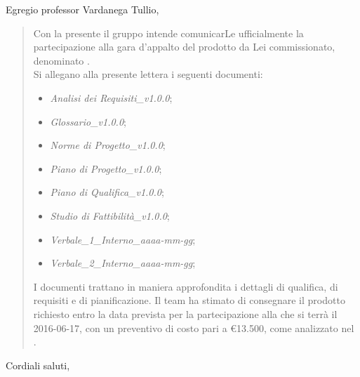 \documentclass{letter}
\begin{document}
\begin{letter}
		\opening{Egregio professor Vardanega Tullio,}
			\begin{quotation}			
				Con la presente il gruppo \gruppo intende comunicarLe ufficialmente la partecipazione alla gara d'appalto del prodotto da Lei commissionato, denominato \textbf{\progetto}.
				\\
				Si allegano alla presente lettera i seguenti documenti:
				\begin{itemize}
					\item \textit{Analisi dei Requisiti\_v1.0.0};
					\item \textit{Glossario\_v1.0.0};
					\item \textit{Norme di Progetto\_v1.0.0};
					\item \textit{Piano di Progetto\_v1.0.0};
					\item \textit{Piano di Qualifica\_v1.0.0};
					\item \textit{Studio di Fattibilità\_v1.0.0};
					\item \textit{Verbale\_1\_Interno\_aaaa-mm-gg};
					\item \textit{Verbale\_2\_Interno\_aaaa-mm-gg};
				\end{itemize}
				I documenti trattano in maniera approfondita i dettagli di qualifica, di requisiti e di pianificazione.	
				Il team ha stimato di consegnare il prodotto richiesto entro la data prevista per la partecipazione alla \textit{\RA} che si terrà il 2016-06-17, con un preventivo di costo pari a \euro13.500, come analizzato nel \textit{\PdP}.	
			\end{quotation}
		\closing{Cordiali saluti,}
	\end{letter}
\end{document}
